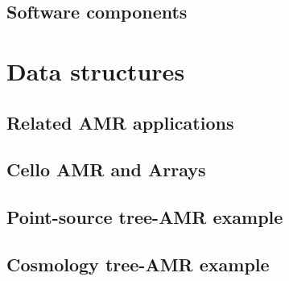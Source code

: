 \documentclass{beamer}
\begin{document}





\subsection{Software components}


% 
% 
% 
% 
% 

\section{Data structures}

\subsection{Related AMR applications}






\subsection{Cello AMR and Arrays}





\subsection{Point-source tree-AMR example}


\subsection{Cosmology tree-AMR example}

\end{document}
